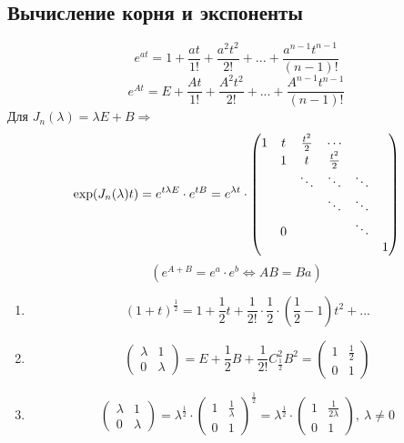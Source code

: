     \subsection{Вычисление корня и экспоненты}
    $$e^{at} = 1 + \frac{at}{1!} + \frac{a^2t^2}{2!} + ... + \frac{a^{n-1}t^{n-1}}{(n-1)!}$$
    $$e^{At} = E + \frac{At}{1!} + \frac{A^2t^2}{2!} + ... + \frac{A^{n-1}t^{n-1}}{(n-1)!}$$
    Для $J_n(\lambda) = \lambda E + B \Longrightarrow$ 
    $$\exp (J_n(\lambda)t) = e^{t \lambda E} \cdot e^{tB} = e^{\lambda t}\cdot \begin{pmatrix}
        1 & t & \frac{t^2}{2} & \cdots\\
        \null & 1 & t & \frac{t^2}{2}\\
        \null & \null & \ddots & \ddots & \ddots\\
        \null & \null & \null & \ddots & \ddots & \null\\
        \null & 0 & \null & \null & \ddots \\
        \null & \null & \null & \null & \null & 1
    \end{pmatrix}
    $$
    $$(e^{A + B} = e^a \cdot e^b \Longleftrightarrow AB = Ba)$$
    \begin{example}\tab
        \begin{enumerate}
            \item $$(1 + t)^{\frac{1}{2}} = 1 + \frac{1}{2}t +      \frac{1}{2!}\cdot \frac{1}{2}\cdot(\frac{1}{2}-1)t^2 + ...$$
            \item $$\begin{pmatrix}
            \lambda & 1 \\
                0 & \lambda
                \end{pmatrix} = E + \frac{1}{2}B + \frac{1}{2!}C^2_{\frac{1}{2}}B^2 = \begin{pmatrix}
                1 & \frac{1}{2} \\
                0 & 1
                \end{pmatrix}$$
            \item $$\begin{pmatrix}
                    \lambda & 1 \\
                    0 & \lambda
                \end{pmatrix} = \lambda^{\frac{1}{2}} \cdot \begin{pmatrix}
                    1 & \frac{1}{\lambda} \\ 0 & 1
                \end{pmatrix}^{\frac{1}{2}} = \lambda^{\frac{1}{2}} \cdot \begin{pmatrix}
                    1 & \frac{1}{2\lambda} \\
                    0 & 1
                \end{pmatrix},  \ \lambda \neq 0$$
        \end{enumerate}
    \end{example}

    
    
    
